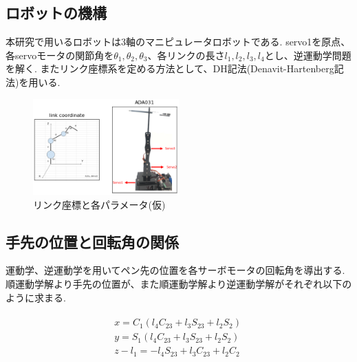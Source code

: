 \documentclass[10pt]{jarticle}
\begin{document}
	\subsection{ロボットの機構}
	本研究で用いるロボットは3軸のマニピュレータロボットである.
	servo1を原点、各servoモータの関節角を$\theta_1, \theta_2, \theta_3$、各リンクの長さ$l_1, l_2, l_3, l_4$とし、逆運動学問題を解く.
	またリンク座標系を定める方法として、DH記法(Denavit-Hartenberg記法)を用いる.

    \begin{center}
        \begin{figure}[h]
            \includegraphics[width=0.5\textwidth]{img/002.png}
            \caption{リンク座標と各パラメータ(仮)}
            \label{manipulator}
        \end{figure}
    \end{center}
    
	\subsection{手先の位置と回転角の関係}
	
	運動学、逆運動学を用いてペン先の位置を各サーボモータの回転角を導出する.
	順運動学解より手先の位置が、また順運動学解より逆運動学解がそれぞれ以下のように求まる.
	
	\scriptsize
	\begin{equation}
		\begin{array}{c}
			\begin{split}
				&  x  =  C_1(l_4C_{23}  +  l_3S_{23}  +  l_2S_2)\quad \\
				&  y  =  S_1(l_4C_{23}  +  l_3S_{23}  +  l_2S_2)\quad \\
				&  z  -  l_1  =  -l_4S_{23}  +  l_3C_{23}  +  l_2C_2\quad \\
			\end{split}
		\end{array}
	\end{equation}
\end{document}
